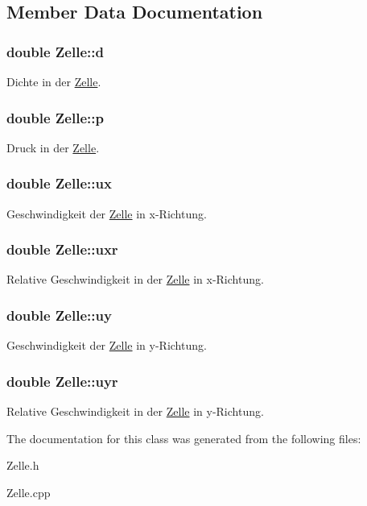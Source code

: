 \subsection{Member Data Documentation}
\hypertarget{classZelle_a3d54ac255189fe1522f13a878b8b82ab}{
\subsubsection[{d}]{\setlength{\rightskip}{0pt plus 5cm}double Zelle\-::d}}\label{classZelle_a3d54ac255189fe1522f13a878b8b82ab}
Dichte in der \hyperlink{classZelle}{Zelle}. \hypertarget{classZelle_ac5c2cf4fb1cfe72d53821acfc1ddbd47}{
\subsubsection[{p}]{\setlength{\rightskip}{0pt plus 5cm}double Zelle\-::p}}\label{classZelle_ac5c2cf4fb1cfe72d53821acfc1ddbd47}
Druck in der \hyperlink{classZelle}{Zelle}. \hypertarget{classZelle_a179e0a80e1922762f0434a7531c4d601}{
\subsubsection[{ux}]{\setlength{\rightskip}{0pt plus 5cm}double Zelle\-::ux}}\label{classZelle_a179e0a80e1922762f0434a7531c4d601}
Geschwindigkeit der \hyperlink{classZelle}{Zelle} in x-\/\-Richtung. \hypertarget{classZelle_ae3e27193aec09588526ccd6ff228d568}{
\subsubsection[{uxr}]{\setlength{\rightskip}{0pt plus 5cm}double Zelle\-::uxr}}\label{classZelle_ae3e27193aec09588526ccd6ff228d568}
Relative Geschwindigkeit in der \hyperlink{classZelle}{Zelle} in x-\/\-Richtung. \hypertarget{classZelle_aef2d80ff73bdaec0d9f6762691b84722}{
\subsubsection[{uy}]{\setlength{\rightskip}{0pt plus 5cm}double Zelle\-::uy}}\label{classZelle_aef2d80ff73bdaec0d9f6762691b84722}
Geschwindigkeit der \hyperlink{classZelle}{Zelle} in y-\/\-Richtung. \hypertarget{classZelle_a10d4168642b40b40aa1cf1292f315249}{
\subsubsection[{uyr}]{\setlength{\rightskip}{0pt plus 5cm}double Zelle\-::uyr}}\label{classZelle_a10d4168642b40b40aa1cf1292f315249}
Relative Geschwindigkeit in der \hyperlink{classZelle}{Zelle} in y-\/\-Richtung. 

The documentation for this class was generated from the following files\-:\begin{DoxyCompactItemize}
\item 
Zelle.\-h\item 
Zelle.\-cpp\end{DoxyCompactItemize}
